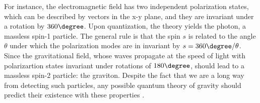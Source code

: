For instance, the electromagnetic field has two independent polarization states, which can be described by vectors in the x-y plane, and they are invariant under a rotation by $360 \degree$.
Upon quantization, the theory yields the photon, a massless spin-1 particle.
The general rule is that the spin $s$ is related to the angle $\theta$ under which the polarization modes are in invariant by $s = 360 \degree /\theta$.
Since the gravitational field, whose waves propagate at the speed of light with polarizartion states invariant under rotations of $180 \degree$, should lead to a massless spin-2 particle: the graviton.
Despite the fact that we are a long way from detecting such particles, any possible quantum theory of gravity should predict their existence with these properties \cite{carroll_spacetime_2003}.



